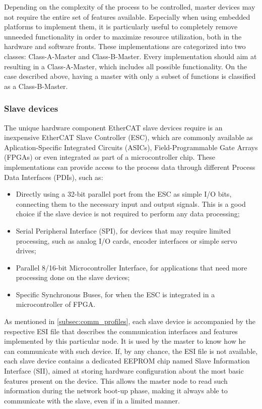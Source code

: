 Depending on the complexity of the process to be controlled, master devices may not require the entire set of features available.
Especially when using embedded platforms to implement them, it is particularly useful to completely remove unneeded functionality in order to maximize resource utilization, both in the hardware and software fronts.
These implementations are categorized into two classes: Class-A-Master and Class-B-Master.
Every implementation should aim at resulting in a Class-A-Master, which includes all possible functionality.
On the case described above, having a master with only a subset of functions is classified as a Class-B-Master.

\subsubsection{Slave devices}

The unique hardware component EtherCAT slave devices require is an inexpensive EtherCAT Slave Controller (ESC), which are commonly available as Aplication-Specific Integrated Circuits (ASICs), Field-Programmable Gate Arrays (FPGAs) or even integrated as part of a microcontroller chip.
These implementations can provide access to the process data through different Process Data Interfaces (PDIs), such as:

\begin{itemize}
	\item Directly using a 32-bit parallel port from the ESC as simple I/O bits, connecting them to the necessary input and output signals. This is a good choice if the slave device is not required to perform any data processing;

	\item Serial Peripheral Interface (SPI), for devices that may require limited processing, such as analog I/O cards, encoder interfaces or simple servo drives;

	\item Parallel 8/16-bit Microcontroller Interface, for applications that need more processing done on the slave devices;

	\item Specific Synchronous Buses, for when the ESC is integrated in a microcontroller of FPGA.
\end{itemize}

As mentioned in \autoref{subsec:comm_profiles}, each slave device is accompanied by the respective ESI file that describes the communication interfaces and features implemented by this particular node.
It is used by the master to know how he can communicate with such device.
If, by any chance, the ESI file is not available, each slave device contains a dedicated EEPROM chip named Slave Information Interface (SII), aimed at storing hardware configuration about the most basic features present on the device.
This allows the master node to read such information during the network boot-up phase, making it always able to communicate with the slave, even if in a limited manner.
